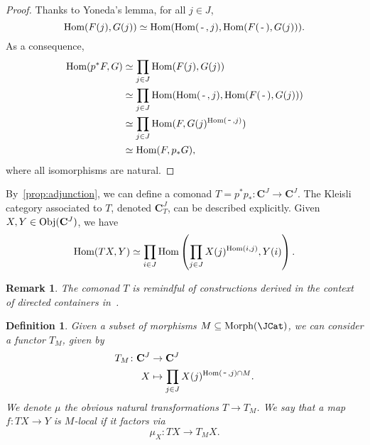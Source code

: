 \documentclass[12pt]{article}
\newtheorem{remark}{Remark}
\newtheorem{definition}{Definition}
\newcommand{\Hom}{{\textnormal{Hom}}}
\newcommand{\Obj}{{\textnormal{Obj}}}
\newcommand{\Morph}{{\textnormal{Morph}}}
\newcommand{\Cat}{{\mathbf{C}}}
\newcommand{\anon}{{\,\mbox{-}\,}}
\begin{document}
\begin{proof}
    Thanks to Yoneda's lemma, for all $j \in J$,
    \begin{equation*}
        \Hom(F(j), G(j)) \simeq \Hom(\Hom(\anon, j), \Hom(F(\anon), G(j))).
    \end{equation*}
    As a consequence,
    \begin{align*}
        \Hom(p^* F, G)
         & \simeq \prod_{j\in J} \Hom(F(j), G(j))                            \\
         & \simeq \prod_{j \in J} \Hom(\Hom(\anon, j), \Hom(F(\anon), G(j))) \\
         & \simeq \prod_{j \in J} \Hom(F, G(j)^{\Hom(\anon, j)})             \\
         & \simeq \Hom(F, p_* G),
    \end{align*}
    where all isomorphisms are natural.
\end{proof}

By~\cref{prop:adjunction}, we can define a comonad $T = p^*p_* \colon \Cat^J \rightarrow \Cat^J$. The Kleisli category associated to $T$, denoted $\Cat^J_T$, can be described explicitly. Given $X, Y\in \Obj(\Cat^J)$, we have
\begin{equation*}
    \Hom(T X, Y) \simeq
    \prod_{i \in J} \Hom\left(\prod_{j \in J} X(j)^{\Hom(i, j)}, Y(i)\right).
\end{equation*}

\begin{remark}
    The comonad $T$ is remindful of constructions derived in the context of {\em directed containers} in~\cite{Ahman_2016,uustalu_comonadic_2008}.
\end{remark}

\begin{definition}
    Given a subset of morphisms $M \subseteq \Morph(\JCat)$, we can consider a functor $T_M$, given by
    \begin{align*}
        T_M \colon \Cat^J & \rightarrow \Cat^J                                    \\
        X                 & \mapsto \prod_{j \in J} X(j)^{\Hom(\anon, j) \cap M}.
    \end{align*}
    We denote $\mu$ the obvious natural transformations $T \rightarrow T_M$.
    We say that a map $f\colon TX \rightarrow Y$ is $M$-local if it factors via
    \begin{equation*}
        \mu_X \colon TX \rightarrow T_M X.
    \end{equation*}
\end{definition}
  


\end{document}
